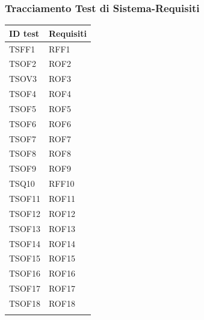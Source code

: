 \documentclass[../PianoDiQualifica_v4.0.0.tex]{subfiles}
\begin{document}
	\subsubsection{Tracciamento Test di Sistema-Requisiti}
	\begin{longtable}[c] { >{\centering\arraybackslash}p{3cm} >{\centering\arraybackslash}p{3cm}}
		\toprule
		\centerline{\textbf{ID test}} & \centerline{\textbf{Requisiti}} \\
			\midrule
			TSFF1 & RFF1 \\
			\addlinespace[0.3em]
			\midrule
			\addlinespace[0.3em]
			TSOF2 & ROF2 \\
			\addlinespace[0.3em]
			\midrule
			\addlinespace[0.3em]
			TSOV3 & ROF3 \\
			\addlinespace[0.3em]
			\midrule
			\addlinespace[0.3em]
			TSOF4 & ROF4 \\
			\addlinespace[0.3em]
			\midrule
			\addlinespace[0.3em]
			TSOF5 & ROF5 \\
			\addlinespace[0.3em]
			\midrule
			\addlinespace[0.3em]
			TSOF6 & ROF6 \\
			\addlinespace[0.3em]
			\midrule
			\addlinespace[0.3em]
			TSOF7 & ROF7 \\
			\addlinespace[0.3em]
			\midrule
			\addlinespace[0.3em]
			TSOF8 & ROF8 \\
			\addlinespace[0.3em]
			\midrule
			\addlinespace[0.3em]
			TSOF9 & ROF9 \\
			\addlinespace[0.3em]
			\midrule
			\addlinespace[0.3em]
			TSQ10 & RFF10 \\
			\addlinespace[0.3em]
			\midrule
			\addlinespace[0.3em]
			TSOF11 & ROF11 \\
			\addlinespace[0.3em]
			\midrule
			\addlinespace[0.3em]
			TSOF12 & ROF12 \\
			\addlinespace[0.3em]
			\midrule
			\addlinespace[0.3em]
			TSOF13 & ROF13 \\
			\addlinespace[0.3em]
			\midrule
			\addlinespace[0.3em]
			TSOF14 & ROF14 \\
			\addlinespace[0.3em]
			\midrule
			\addlinespace[0.3em]
			TSOF15 & ROF15 \\
			\addlinespace[0.3em]
			\midrule
			\addlinespace[0.3em]
			TSOF16 & ROF16 \\
			\addlinespace[0.3em]
			\midrule
			\addlinespace[0.3em]
			TSOF17 & ROF17 \\
			\addlinespace[0.3em]
			\midrule
			\addlinespace[0.3em]
			TSOF18 & ROF18 \\
			\addlinespace[0.3em]

\end{longtable}
\end{document}
